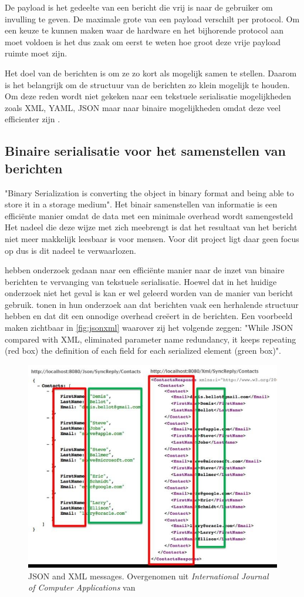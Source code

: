 \documentclass[a4paper, 11pt, oneside]{report}
\begin{document}
De payload is het gedeelte van een bericht die vrij is naar de gebruiker om invulling te geven.
De maximale grote van een payload verschilt per protocol.
Om een keuze te kunnen maken waar de hardware en het bijhorende protocol aan moet voldoen is het dus zaak om eerst te weten hoe groot deze vrije payload ruimte moet zijn.

Het doel van de berichten is om ze zo kort als mogelijk samen te stellen. 
Daarom is het belangrijk om de structuur van de berichten zo klein mogelijk te houden.
Om deze reden wordt niet gekeken naar een tekstuele serialisatie mogelijkheden zoals XML, YAML, JSON maar naar binaire mogelijkheden omdat deze veel efficienter zijn \cite{binary}.

\subsection{Binaire serialisatie voor het samenstellen van berichten} 

"Binary Serialization is converting the object in binary format and being able to store it in a storage medium"\cite{binary}. 
Het binair samenstellen van informatie is een efficiënte manier omdat de data met een minimale overhead wordt samengesteld \cite{binaryMessaging}
Het nadeel die deze wijze met zich meebrengt is dat het resultaat van het bericht niet meer makkelijk leesbaar is voor mensen.
Voor dit project ligt daar geen focus op dus is dit nadeel te verwaarlozen.

 hebben onderzoek gedaan naar een efficiënte manier naar de inzet van binaire berichten te vervanging van tekstuele serialisatie.
Hoewel dat in het huidige onderzoek niet het geval is kan er wel geleerd worden van de manier van bericht gebruik.
 tonen in hun onderzoek aan dat berichten vaak een herhalende structuur hebben en dat dit een onnodige overhead creëert in de berichten.
Een voorbeeld maken  zichtbaar in \autoref{fig:jsonxml} waarover zij het volgende zeggen: "While JSON  compared  with  XML,  eliminated  parameter  name redundancy, it keeps repeating (red box) the definition of each field  for  each  serialized  element  (green  box)". 
\begin{figure}[H]
	\begin{center}\includegraphics[width=0.5\linewidth]{JSONandXML.jpeg}\end{center}
	\caption{JSON and XML messages. Overgenomen uit \textit{International Journal of Computer Applications}  van \protect{}  }
	\label{fig:jsonxml}
\end{figure}
\end{document}
